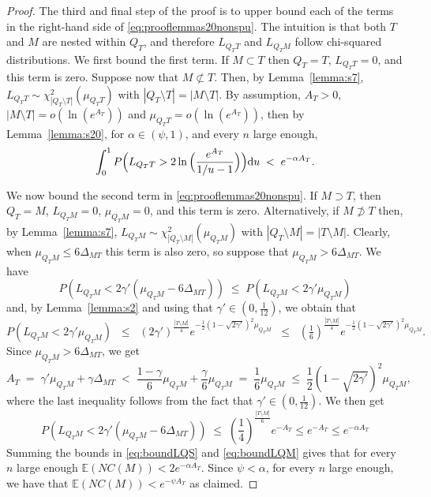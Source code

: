 \documentclass[
  12pt]{article}
\newcommand{\E}{\mathbb{E}}
\begin{document}
\begin{proof}
The third and final step of the proof is to upper bound each of the terms in the right-hand side of \eqref{eq:prooflemmas20nonspu}. The intuition is that both $T$ and $M$ are nested within $Q_T$, and therefore $L_{Q_T T}$ and $L_{Q_T M}$ follow chi-squared distributions.
We first bound the first term. %
If $M \subset T$ then $Q_T=T$, $L_{Q_TT}=0$, and this term is zero. Suppose now that $M \not\subset T$. %
Then, by Lemma~\ref{lemma:s7}, %
$L_{Q_TT} \sim \mathcal{\chi}_{|Q_T\setminus T|}^2(\mu_{Q_TT})$ with $|Q_T\setminus T|=|M\setminus T|$. By assumption, $A_T>0$, $|M\setminus T|=o(\ln(e^{A_T}))$ and $\mu_{Q_TT}=o(\ln(e^{A_T}))$, then  by Lemma~\ref{lemma:s20}, for $\alpha\in(\psi,1)$, and every $n$ large enough,
\begin{equation}\label{eq:boundLQS}
\int_0^1P\Bigl(L_{Q_TT}>2\ln{\Bigl(\frac{e^{A_T}}{1 / u-1}\Bigl)}\Bigl){\rm d}u \;<\; 
e^{-\alpha A_T}.
\end{equation}

We now bound the second term in \eqref{eq:prooflemmas20nonspu}. If $M \supset T$, then $Q_T=M$, $L_{Q_TM}=0$, $\mu_{Q_TM}=0$, and this term is zero. Alternatively, if $M \not\supset T$ %
then, by Lemma~\ref{lemma:s7}, $L_{Q_TM} \sim \chi_{|Q_T\setminus M|}^2(\mu_{Q_TM})$ with $|Q_T\setminus M|=|T\setminus M|$.
Clearly, when $\mu_{Q_TM}\leq 6\Delta_{MT}$ this term is also zero, so suppose that $\mu_{Q_TM}> 6\Delta_{MT}$.  
We have  
$$P\left(L_{Q_TM}<2\gamma'(\mu_{Q_TM}-6\Delta_{MT})\right)\; \leq \; P\left(L_{Q_TM}<2\gamma'\mu_{Q_TM}\right)$$ 
and, by Lemma~\ref{lemma:s2} and using that $\gamma'\in (0,\tfrac{1}{12})$, we obtain that 
$$P\left(L_{Q_TM}<2\gamma'\mu_{Q_TM}\right) \;\;\leq\;\; (2\gamma')^{\frac{|T\setminus M|}{4}} e^{-\frac{1}{2}(1-\sqrt{2\gamma'})^2\mu_{Q_TM}}\;\;\leq\;\;  (\tfrac16)^{\frac{|T\setminus M|}{4}}e^{-\frac{1}{2}(1-\sqrt{2\gamma'})^2\mu_{Q_TM}}.$$
Since $\mu_{Q_TM}>6\Delta_{MT}$, we get
$$
A_T\;=\;\gamma'\mu_{Q_TM}+\gamma\Delta_{MT}\;<\;\frac{1-\gamma}{6}\mu_{Q_TM}+\frac{\gamma}{6}\mu_{Q_TM}\;=\;\frac16\mu_{Q_TM}\;\leq\;\frac12(1-\sqrt{2\gamma'})^2\mu_{Q_TM},
$$
where the last inequality follows from the fact that $\gamma'\in(0, \tfrac{1}{12})$. We then get
\begin{equation}\label{eq:boundLQM}
    P\left(L_{Q_TM}<2\gamma'(\mu_{Q_TM}-6\Delta_{MT})\right) \;\leq\; \left(\frac14\right)^{\frac{|T\setminus M|}{6}}e^{-A_T} \leq e^{-A_T}\leq e^{-\alpha A_T}
\end{equation}
Summing the bounds in \eqref{eq:boundLQS} and \eqref{eq:boundLQM} gives that for every $n$ large enough $\E\left(NC(M)\right) < 2e^{-\alpha A_T}$. Since $\psi<\alpha$, for every $n$ large enough, we have that $\E\left(NC(M)\right) < e^{-\psi A_T}$ as claimed.
\end{proof}
\end{document}
